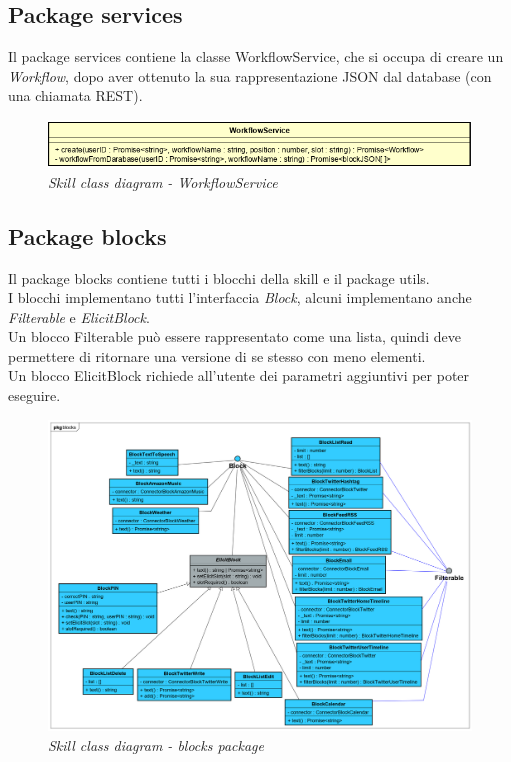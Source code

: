 \subsection{Package services}
Il package services contiene la classe WorkflowService, che si occupa di creare un \textit{Workflow}, dopo aver ottenuto la sua rappresentazione JSON dal database (con una chiamata REST).
\begin{figure} [H]
    \centering
	\includegraphics[scale=0.7]{./images/WorkflowService.PNG}
	\caption{\textit{Skill class diagram - WorkflowService}}\label{classlambda}
\end{figure}
\clearpage
\subsection{Package blocks}
Il package blocks contiene tutti i blocchi della skill e il package utils.\\
I blocchi implementano tutti l'interfaccia \textit{Block}, alcuni implementano anche \textit{Filterable} e \textit{ElicitBlock}.\\
Un blocco Filterable può essere rappresentato come una lista, quindi deve permettere di ritornare una versione di se stesso con meno elementi.\\
Un blocco ElicitBlock richiede all'utente dei parametri aggiuntivi per poter eseguire.
\begin{figure} [H]
    \centering
	\includegraphics[scale=0.24]{./images/ZeroSevenClassBlocks.png}
	\caption{\textit{Skill class diagram - blocks package}}\label{classlambda}
\end{figure}

